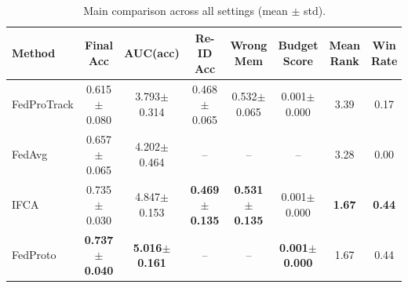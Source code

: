 \begin{table}[t]
\centering
\caption{Main comparison across all settings (mean $\pm$ std).}
\label{tab:main}
\begin{tabular}{lccccccc}
\toprule
Method & Final Acc & AUC(acc) & Re-ID Acc & Wrong Mem & Budget Score & Mean Rank & Win Rate \\
\midrule
FedProTrack & 0.615$\pm$0.080 & 3.793$\pm$0.314 & 0.468$\pm$0.065 & 0.532$\pm$0.065 & 0.001$\pm$0.000 & 3.39 & 0.17 \\
FedAvg & 0.657$\pm$0.065 & 4.202$\pm$0.464 & -- & -- & -- & 3.28 & 0.00 \\
IFCA & 0.735$\pm$0.030 & 4.847$\pm$0.153 & \textbf{0.469$\pm$0.135} & \textbf{0.531$\pm$0.135} & 0.001$\pm$0.000 & \textbf{1.67} & \textbf{0.44} \\
FedProto & \textbf{0.737$\pm$0.040} & \textbf{5.016$\pm$0.161} & -- & -- & \textbf{0.001$\pm$0.000} & 1.67 & 0.44 \\
\bottomrule
\end{tabular}
\end{table}